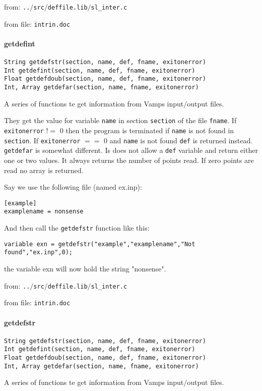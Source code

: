 from: {\tt ..$/$src$/$deffile.lib$/$sl\_inter.c}

from file: {\tt intrin.doc}


\paragraph{getdefint}
\begin{verbatim}
String getdefstr(section, name, def, fname, exitonerror)
Int getdefint(section, name, def, fname, exitonerror)
Float getdefdoub(section, name, def, fname, exitonerror)
Int, Array getdefar(section, name, fname, exitonerror)
\end{verbatim}
A series of functions te get information from Vamps input$/$output files.


They get the value for variable {\tt name} in section {\tt section}
of the file {\tt fname}. If {\tt exitonerror} !$=$ 0 then the
program is terminated if {\tt name} is not found in {\tt section}.
If {\tt exitonerror} $=$$=$ 0 and {\tt name} is not found {\tt def} is
returned instead.
{\tt getdefar} is somewhat different. Is does not allow a {\tt def}
variable and return either one or two values. It always returns
the number of points read. If zero
points are read no array is returned.


Say we use the following file (named ex.inp):
\begin{verbatim}
[example]
examplename = nonsense
\end{verbatim}
And then call the {\tt getdefstr} function like this:
\begin{verbatim}
variable exn = getdefstr("example","examplename","Not found","ex.inp",0);
\end{verbatim}
the variable exn will now hold the string "nonsense".


from: {\tt ..$/$src$/$deffile.lib$/$sl\_inter.c}

from file: {\tt intrin.doc}


\paragraph{getdefstr}
\begin{verbatim}
String getdefstr(section, name, def, fname, exitonerror)
Int getdefint(section, name, def, fname, exitonerror)
Float getdefdoub(section, name, def, fname, exitonerror)
Int, Array getdefar(section, name, fname, exitonerror)
\end{verbatim}
A series of functions te get information from Vamps input$/$output files.


